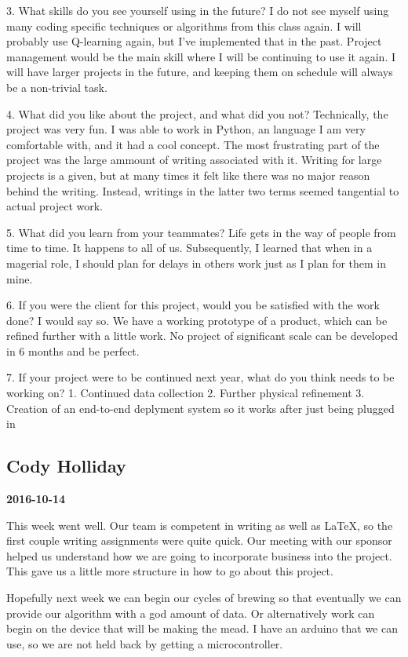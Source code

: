 3. What skills do you see yourself using in the future?
I do not see myself using many coding specific techniques or algorithms from this class again. I will probably use Q-learning again, but I've implemented that in the past. Project management would be the main skill where I will be continuing to use it again. I will have larger projects in the future, and keeping them on schedule will always be a non-trivial task.

4. What did you like about the project, and what did you not?
Technically, the project was very fun. I was able to work in Python, an language I am very comfortable with, and it had a cool concept. The most frustrating part of the project was the large ammount of writing associated with it. Writing for large projects is a given, but at many times it felt like there was no major reason behind the writing. Instead, writings in the latter two terms seemed tangential to actual project work.

5. What did you learn from your teammates?
Life gets in the way of people from time to time. It happens to all of us. Subsequently, I learned that when in a magerial role, I should plan for delays in others work just as I plan for them in mine. 

6. If you were the client for this project, would you be satisfied with the work done?
I would say so. We have a working prototype of a product, which can be refined further with a little work. No project of significant scale can be developed in 6 months and be perfect.

7. If your project were to be continued next year, what do you think needs to be working on?
  1. Continued data collection
  2. Further physical refinement
  3. Creation of an end-to-end deplyment system so it works after just being plugged in

\subsection{Cody Holliday}

\textbf{2016-10-14}

This week went well. Our team is competent in writing as well as LaTeX, so the first couple writing assignments were quite quick. Our meeting with our sponsor helped us understand how we are going to incorporate business into the project. This gave us a little more structure in how to go about this project. 

Hopefully next week we can begin our cycles of brewing so that eventually we can provide our algorithm with a god amount of data. Or alternatively work can begin on the device that will be making the mead. I have an arduino that we can use, so we are not held back by getting a microcontroller. 

